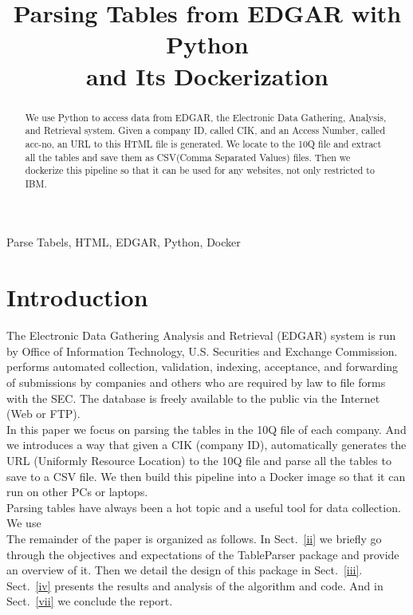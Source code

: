 \documentclass[conference]{IEEEtran}
\begin{document}
\title{Parsing Tables from EDGAR with Python \\and Its Dockerization}
%
\author{
}
\maketitle
\begin{abstract}
We use Python to access data from EDGAR, the Electronic Data Gathering, Analysis, and Retrieval system. Given a company ID, called CIK, and an Access Number, called acc-no, an URL to this HTML file is generated. We locate to the 10Q file and extract all the tables and save them as CSV(Comma Separated Values) files. Then we dockerize this pipeline so that it can be used for any websites, not only restricted to IBM.
\end{abstract}
\begin{keywords}
Parse Tabels, HTML, EDGAR, Python, Docker
\end{keywords}
\IEEEpeerreviewmaketitle
%
\section{Introduction}\label{i}
\indent The Electronic Data Gathering Analysis and Retrieval (EDGAR) system is run by Office of Information Technology, U.S. Securities and Exchange Commission. performs automated collection, validation, indexing, acceptance, and forwarding of submissions by companies and others who are required by law to file forms with the SEC. The database is freely available to the public via the Internet (Web or FTP).
\\
\indent In this paper we focus on parsing the tables in the 10Q file of each company. And we introduces a way that given a CIK (company ID), automatically generates the URL (Uniformly Resource Location) to the 10Q file and parse all the tables to save to a CSV file. We then build this pipeline into a Docker image so that it can run on other PCs or laptops. 
\\
\indent Parsing tables have always been a hot topic and a useful tool for data collection. We use 
\\
\indent The remainder of the paper is organized as follows. In Sect.~\ref{ii} we briefly go through the objectives and expectations of the TableParser package and provide an overview of it. Then we detail the design of this package in Sect.~\ref{iii}. Sect.~\ref{iv} presents the results and analysis of the algorithm and code. And in Sect.~\ref{vii} we conclude the report.
\\
\end{document}
